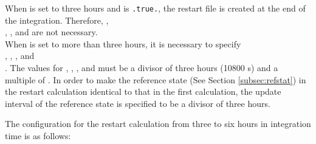 \begin{enumerate}
When  is set to three hours and  is \verb|.true.|, the restart file is created at the end of the integration. Therefore, , \\
, , and  are not necessary.\\
When  is set to more than three hours, it is necessary to specify \\
, , , and \\
.
The values for , , , and  must be a divisor of three hours (10800 s) and a multiple of .
In order to make the reference state (See Section \ref{subsec:refstat}) in the restart calculation identical to that in the first calculation, the update interval of the reference state is specified to be a divisor of three hours.


The configuration for the restart calculation from three to six hours in integration time is as follows:\\


\end{enumerate}
